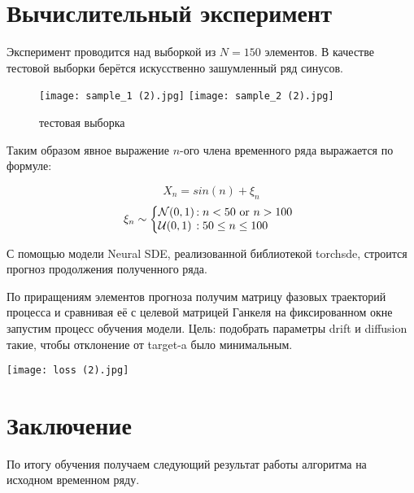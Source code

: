 \documentclass{article}
\begin{document}
\section{Вычислительный эксперимент}

   \par Эксперимент проводится над выборкой из $N=150$ элементов. В качестве тестовой выборки берётся искусственно зашумленный ряд синусов. 
   
    \begin{figure}[htp]
    \centering
    \texttt{[image: sample\_1 (2).jpg]}
    \texttt{[image: sample\_2 (2).jpg]}
    \caption{тестовая выборка}
    \label{fig:galaxy}
    \end{figure}

   \par Таким образом явное выражение $n$-ого члена временного ряда выражается по формуле:


\begin{equation}
       X_n = sin(n) + \xi_n 
   \end{equation}
\[
  \xi_n \sim \left\{
     \begin{array}{@{}l@{\thinspace}l}
       \mathcal{N}(0,1)  &: n < 50 \text{ or } n > 100\\
       \mathcal{U}(0,1) &: 50 \leq n \leq 100 \\

     \end{array}
   \right.
\]

   \par С помощью модели Neural SDE, реализованной библиотекой torchsde, строится прогноз продолжения полученного ряда.

   \par По приращениям элементов прогноза получим матрицу фазовых траекторий процесса и сравнивая её с целевой матрицей Ганкеля на фиксированном окне запустим процесс обучения модели. Цель: подобрать параметры drift и diffusion такие, чтобы отклонение от target-a было минимальным.

    \centering
    \texttt{[image: loss (2).jpg]}
    \caption{процесс обучения}
    \label{fig:galaxy}

    
\section{Заключение}

   \par По итогу обучения получаем следующий результат работы алгоритма на исходном временном ряду.
\end{document}
